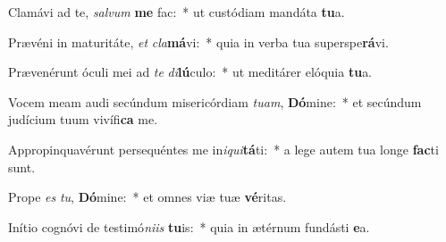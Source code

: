 \item Clamávi ad te, \textit{sal}\textit{vum} \textbf{me} fac:~* ut custódiam mandáta \textbf{tu}a.
\item Prævéni in maturitáte, \textit{et} \textit{cla}\textbf{má}vi:~* quia in verba tua superspe\textbf{rá}vi.
\item Prævenérunt óculi mei ad \textit{te} \textit{di}\textbf{lú}culo:~* ut meditárer elóquia \textbf{tu}a.
\item Vocem meam audi secúndum misericórdiam \textit{tu}\textit{am}, \textbf{Dó}mine:~* et secúndum judícium tuum vivífi\textbf{ca} me.
\item Appropinquavérunt persequéntes me in\textit{i}\textit{qui}\textbf{tá}ti:~* a lege autem tua longe \textbf{fac}ti sunt.
\item Prope \textit{es} \textit{tu}, \textbf{Dó}mine:~* et omnes viæ tuæ \textbf{vé}ritas.
\item Inítio cognóvi de testimó\textit{ni}\textit{is} \textbf{tu}is:~* quia in ætérnum fundásti \textbf{e}a.
